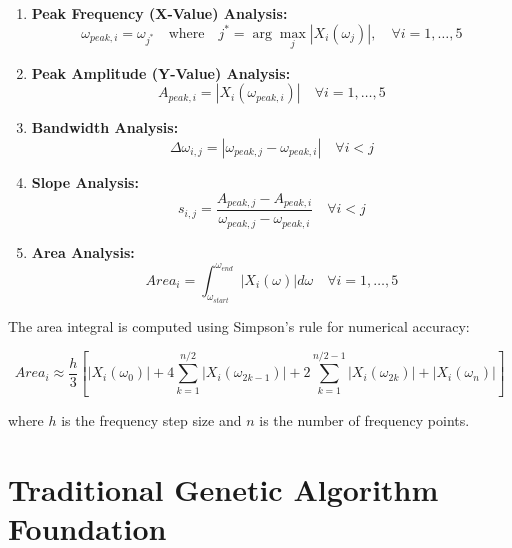 \documentclass[12pt,a4paper]{article}
\begin{document}
\begin{enumerate}
    \item \textbf{Peak Frequency (X-Value) Analysis:}
    \begin{equation}\label{Eq.peak_frequency_analysis_detailed}
    \omega_{peak,i} = \omega_{j^*} \quad \text{where} \quad j^* = \arg\max_{j} |X_i(\omega_j)|, \quad \forall i = 1,\ldots,5
    \end{equation}

    \item \textbf{Peak Amplitude (Y-Value) Analysis:}
    \begin{equation}\label{Eq.peak_amplitude_analysis_detailed}
    A_{peak,i} = |X_i(\omega_{peak,i})| \quad \forall i = 1,\ldots,5
    \end{equation}

    \item \textbf{Bandwidth Analysis:}
    \begin{equation}\label{Eq.bandwidth_analysis_detailed}
    \Delta\omega_{i,j} = |\omega_{peak,j} - \omega_{peak,i}| \quad \forall i < j
    \end{equation}

    \item \textbf{Slope Analysis:}
    \begin{equation}\label{Eq.slope_analysis_detailed}
    s_{i,j} = \frac{A_{peak,j} - A_{peak,i}}{\omega_{peak,j} - \omega_{peak,i}} \quad \forall i < j
    \end{equation}

    \item \textbf{Area Analysis:}
    \begin{equation}\label{Eq.area_analysis_detailed}
    Area_i = \int_{\omega_{start}}^{\omega_{end}} |X_i(\omega)| d\omega \quad \forall i = 1,\ldots,5
\end{equation}
\end{enumerate}

The area integral is computed using Simpson's rule for numerical accuracy:

\begin{equation}\label{Eq.area_simpson_detailed}
Area_i \approx \frac{h}{3} \left[|X_i(\omega_0)| + 4\sum_{k=1}^{n/2} |X_i(\omega_{2k-1})| + 2\sum_{k=1}^{n/2-1} |X_i(\omega_{2k})| + |X_i(\omega_n)| \right]
\end{equation}

where $h$ is the frequency step size and $n$ is the number of frequency points.

\section{Traditional Genetic Algorithm Foundation}
\end{document}

